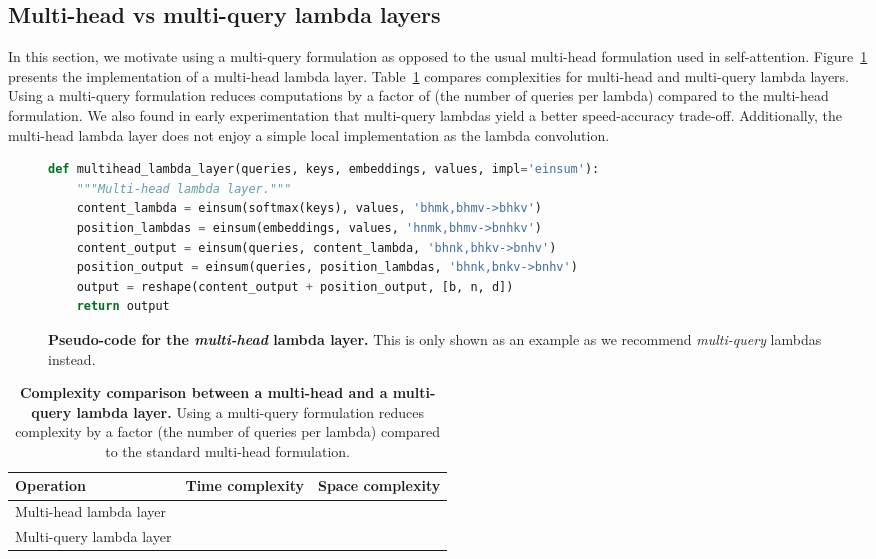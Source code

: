 \documentclass{article} \usepackage{iclr2021_conference,times}
\begin{document}
\subsection{Multi-head vs multi-query lambda layers}
In this section, we motivate using a multi-query formulation as opposed to the usual multi-head formulation used in self-attention.
Figure~\ref{fig:multihead_lambda_layer_code} presents the implementation of a multi-head lambda layer.
Table~\ref{tab:multihead_vs_multiquery} compares complexities for multi-head and multi-query lambda layers.
Using a multi-query formulation reduces computations by a factor of  (the number of queries per lambda) compared to the multi-head formulation.
We also found in early experimentation that multi-query lambdas yield a better speed-accuracy trade-off.
Additionally, the multi-head lambda layer does not enjoy a simple local implementation as the lambda convolution.

\begin{figure}[h]
\small
\begin{lstlisting}[language=python]
def multihead_lambda_layer(queries, keys, embeddings, values, impl='einsum'):
    """Multi-head lambda layer."""
    content_lambda = einsum(softmax(keys), values, 'bhmk,bhmv->bhkv')
    position_lambdas = einsum(embeddings, values, 'hnmk,bhmv->bnhkv')
    content_output = einsum(queries, content_lambda, 'bhnk,bhkv->bnhv')
    position_output = einsum(queries, position_lambdas, 'bhnk,bnkv->bnhv')
    output = reshape(content_output + position_output, [b, n, d])
    return output
\end{lstlisting}
    \caption{
    \textbf{Pseudo-code for the \emph{multi-head} lambda layer.}
    This is only shown as an example as we recommend \emph{multi-query} lambdas instead.
    }
    \label{fig:multihead_lambda_layer_code}
\end{figure}

\begin{table}[h!]
  \begin{center}
  \small
  \begin{tabular}{l|cc}
    \toprule
    Operation & Time complexity & Space complexity \\
    \midrule
    Multi-head lambda layer &  &  \\
    Multi-query lambda layer &  &  \\
    \bottomrule
  \end{tabular}
  \caption{
  \textbf{Complexity comparison between a multi-head and a multi-query lambda layer.} 
  Using a multi-query formulation reduces complexity by a factor  (the number of queries per lambda) compared to the standard multi-head formulation.}
  \label{tab:multihead_vs_multiquery}
\end{center}
\end{table}
\end{document}
